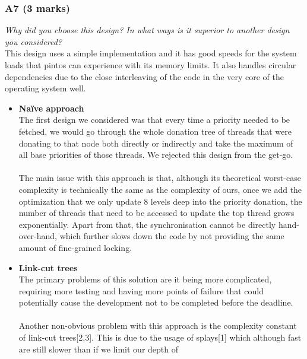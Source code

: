 \documentclass{report}
\newcommand{\question}[1]{\textit{#1} \\ }
\newcommand{\bullpara}[2]{\item \textbf{#1} \ #2}
\begin{document}
                \subsubsection*{A7  (3 marks)}
                    \question{Why did you choose this design? In what ways is it superior to another design you considered?}
                    This design uses a simple implementation and it has good speeds for the system loads that pintos can experience with its memory limits.
                    It also handles circular dependencies due to the close interleaving of the code in the very core of the operating system well.
                    \begin{itemize}
                        \bullpara{Naïve approach}{
                            \\ The first design we considered was that every time a priority needed to be fetched, we would go through the whole donation tree of threads 
                            that were donating to that node both directly or indirectly and take the maximum of all base priorities of those threads. We rejected this design
                            from the get-go. 
                            \\ \\ The main issue with this approach is that, although its theoretical worst-case complexity is 
                            technically the same as the complexity of ours, once we add the optimization that we only update 8 levels deep into the priority donation,
                            the number of threads that need to be accessed to update the top thread grows exponentially. Apart from that,
                            the synchronisation cannot be directly hand-over-hand, which further slows down the code by not providing the same amount of fine-grained
                            locking.
                        }
                        \bullpara{Link-cut trees}{
                            \\ The primary problems of this solution are it being more complicated, requiring more testing and having more points of failure that
                            could potentially cause the development not to be completed before the deadline. 
                            \\ \\ Another non-obvious problem with this approach is
                            the complexity constant of link-cut trees[2,3]. This is due to the usage of splays[1] which although fast are still slower than if we limit our depth of
}
\end{itemize}
\end{document}
